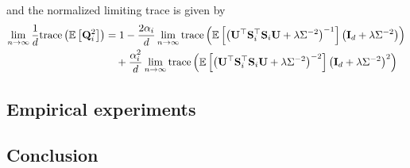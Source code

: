 and the normalized limiting trace is given by
\begin{align*}
\lim_{n\rightarrow\infty}\frac{1}{d}\mathrm{trace}\left(\mathbb{E}\left[\mathbf{Q}_i^2\right]\right) &= 1 - \frac{2\alpha_i}{d}\lim_{n\rightarrow\infty}\mathrm{trace}\left(\mathbb{E}\left[\left(\mathbf{U}^\top\mathbf{S}_i^\top\mathbf{S}_i\mathbf{U} + \lambda\Sigma^{-2}\right)^{-1}\right]\left(\mathbf{I}_d + \lambda\Sigma^{-2}\right)\right) \\
&\quad + \frac{\alpha_i^2}{d}\lim_{n\rightarrow\infty}\mathrm{trace}\left(\mathbb{E}\left[\left(\mathbf{U}^\top\mathbf{S}_i^\top\mathbf{S}_i\mathbf{U} + \lambda\Sigma^{-2}\right)^{-2}\right]\left(\mathbf{I}_d + \lambda\Sigma^{-2}\right)^2\right)
\end{align*}

\subsection{Empirical experiments} \label{sec:empirical}


\subsection{Conclusion} \label{sec:conclusion}